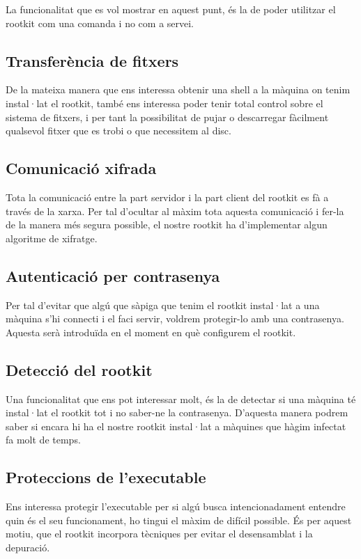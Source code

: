 La funcionalitat que es vol mostrar en aquest punt, és la de poder utilitzar el rootkit com una comanda i no com a servei.

\subsection{Transferència de fitxers}
De la mateixa manera que ens interessa obtenir una shell a la màquina on tenim instal·lat el rootkit, també ens interessa
poder tenir total control sobre el sistema de fitxers, i per tant la possibilitat de pujar o descarregar fàcilment 
qualsevol fitxer que es trobi o que necessitem al disc.

\subsection{Comunicació xifrada}
Tota la comunicació entre la part servidor i la part client del rootkit es fà a través de la xarxa. Per tal d'ocultar al màxim 
tota aquesta comunicació i fer-la de la manera més segura possible, el nostre rootkit ha d'implementar algun algoritme de xifratge.

\subsection{Autenticació per contrasenya}
Per tal d'evitar que algú que sàpiga que tenim el rootkit instal·lat a una màquina s'hi connecti i el faci servir, voldrem
protegir-lo amb una contrasenya. Aquesta serà introduïda en el moment en què configurem el rootkit.

\subsection{Detecció del rootkit}
Una funcionalitat que ens pot interessar molt, és la de detectar si una màquina té instal·lat el rootkit tot i no saber-ne la contrasenya. 
D'aquesta manera podrem saber si encara hi ha el nostre rootkit instal·lat a màquines que hàgim infectat fa molt de temps. 

\subsection{Proteccions de l'executable}
Ens interessa protegir l'executable per si algú busca intencionadament entendre quin és el seu funcionament,
ho tingui el màxim de difícil possible. És per aquest motiu, que el rootkit incorpora tècniques per evitar
el desensamblat i la depuració.

